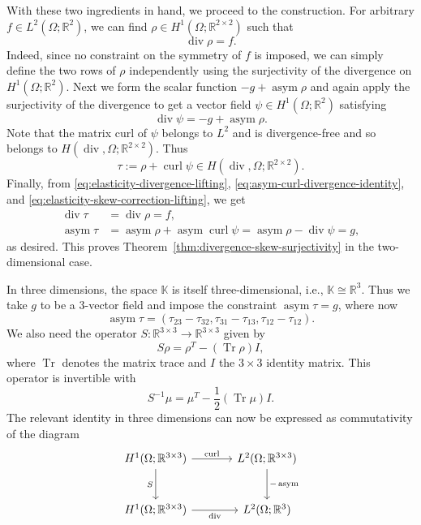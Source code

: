 \begin{Proof}
{With these two ingredients in hand, we proceed to the construction. For arbitrary $f\in L^2(\Omega;\mathbb R^2)$, we can find $\rho\in H^1(\Omega;\mathbb R^{2\times2})$ such that}
\begin{equation}\label{eq:elasticity-divergence-lifting}
\operatorname{div}\rho=f.
\end{equation}
{Indeed, since no constraint on the symmetry of $f$ is imposed, we can simply define the two rows of $\rho$ independently using the surjectivity of the divergence on $H^1(\Omega;\mathbb R^2)$. Next we form the scalar function $-g+\operatorname{asym}\rho$ and again apply the surjectivity of the divergence to get a vector field $\psi\in H^1(\Omega;\mathbb R^2)$ satisfying}
\begin{equation}\label{eq:elasticity-skew-correction-lifting}
\operatorname{div}\psi=-g+\operatorname{asym}\rho.
\end{equation}
{Note that the matrix curl of $\psi$ belongs to $L^2$ and is divergence-free and so belongs to $H(\operatorname{div},\Omega;\mathbb R^{2\times2})$. Thus}
\[
\tau:=\rho+\operatorname{curl}\psi\in H(\operatorname{div},\Omega;\mathbb R^{2\times2}).
\]
{Finally, from \eqref{eq:elasticity-divergence-lifting}, \eqref{eq:asym-curl-divergence-identity}, and \eqref{eq:elasticity-skew-correction-lifting}, we get}
\[
\begin{aligned}
\operatorname{div}\tau&=\operatorname{div}\rho=f,\\
\operatorname{asym}\tau&=\operatorname{asym}\rho+\operatorname{asym}\operatorname{curl}\psi=\operatorname{asym}\rho-\operatorname{div}\psi=g,
\end{aligned}
\]
{as desired. This proves Theorem~\ref{thm:divergence-skew-surjectivity} in the two-dimensional case.}

{In three dimensions, the space $\mathbb K$ is itself three-dimensional, i.e., $\mathbb K\cong\mathbb R^3$. Thus we take $g$ to be a 3-vector field and impose the constraint $\operatorname{asym}\tau=g$, where now}
\[
\operatorname{asym}\tau=(\tau_{23}-\tau_{32},\tau_{31}-\tau_{13},\tau_{12}-\tau_{12}).
\]
{We also need the operator $S:\mathbb R^{3\times3}\to\mathbb R^{3\times3}$ given by}
\[
S\rho=\rho^T-(\operatorname{Tr}\rho)I,
\]
{where $\operatorname{Tr}$ denotes the matrix trace and $I$ the $3\times3$ identity matrix. This operator is invertible with}
\[
S^{-1}\mu=\mu^T-\frac12(\operatorname{Tr}\mu)I.
\]
{The relevant identity in three dimensions can now be expressed as commutativity of the diagram}
\[
\begin{tikzcd}[column sep=large,row sep=large]
H^1(\Omega;\mathbb R^{3\times3})\arrow[r,"\operatorname{curl}"]\arrow[d,"S"']&L^2(\Omega;\mathbb R^{3\times3})\arrow[d,"-\operatorname{asym}"]\\
H^1(\Omega;\mathbb R^{3\times3})\arrow[r,"\operatorname{div}"']&L^2(\Omega;\mathbb R^3)
\end{tikzcd}
\]


\end{Proof}
